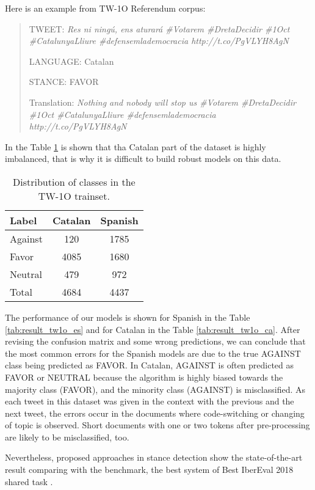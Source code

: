 \documentclass[10pt, a4paper]{article}
\begin{document}
Here is an example from TW-1O Referendum corpus:

\begin{quote}
TWEET: \textit{Res ni ning\'u, ens aturar\'a \#Votarem \#DretaDecidir \#1Oct \#CatalunyaLliure \#defensemlademocracia http://t.co/PgVLYH8AgN }

LANGUAGE: Catalan

STANCE: FAVOR

Translation: \textit{Nothing and nobody will stop us \#Votarem \#DretaDecidir \#1Oct \#CatalunyaLliure \#defensemlademocracia http://t.co/PgVLYH8AgN}
\end{quote}

In the Table \ref{tab:twdatasetdistr} is shown that tha Catalan part of the dataset is highly imbalanced, that is why it is difficult to build robust models on this data.

\begin{table}[!ht]
\centering
\begin{tabular}{lcc} \hline
      Label & Catalan & Spanish\\ \hline
    Against & 120 & 1785 \\
      Favor & 4085 & 1680 \\
     Neutral & 479 & 972 \\ \hline
      Total & 4684 & 4437 \\ \hline
\end{tabular}
\caption{Distribution of classes in the TW-1O trainset.}\label{tab:twdatasetdistr}
\end{table}

The performance of our models is shown for Spanish in the Table \ref{tab:result_tw1o_es} and for Catalan in the Table \ref{tab:result_tw1o_ca}. After revising the confusion matrix and some wrong predictions, we can conclude that the most common errors for the Spanish models are due to the true AGAINST class being predicted as FAVOR. In Catalan, AGAINST is often predicted as FAVOR or NEUTRAL because the algorithm is highly biased towards the majority class (FAVOR), and the minority class (AGAINST) is misclassified. As each tweet in this dataset was given in the context with the previous and the next tweet, the errors occur in the documents where code-switching or changing of topic is observed. Short documents with one or two tokens after pre-processing are likely to be misclassified, too.

Nevertheless, proposed approaches in stance detection show the state-of-the-art result comparing with the benchmark, the best system of Best IberEval 2018 shared task \cite{Segura-Bedmar18,taule18}.
\end{document}
